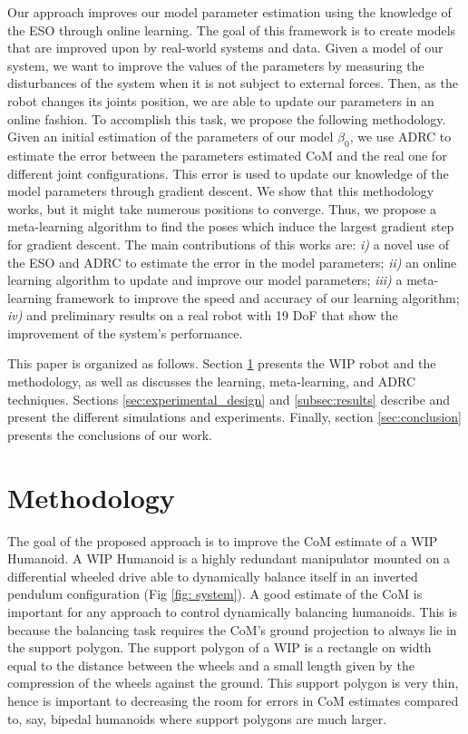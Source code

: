 \documentclass[letterpaper, 10 pt, conference]{ieeeconf}  %
\begin{document}
Our approach improves our model parameter estimation using the knowledge of the \ac{ESO} through online learning.
The goal of this framework is to create models that are improved upon by real-world systems and data. %
Given a model of our system, we want to improve the values of the parameters by measuring the disturbances of the system when it is not subject to external forces. Then, as the robot changes its joints position, we are able to update our parameters in an online fashion.
To accomplish this task, we propose the following methodology. Given an initial estimation of the parameters of our model $\beta_0$, we use \ac{ADRC} \cite{Gao2006} to estimate the error between the parameters estimated \ac{CoM} and the real one for different joint configurations. This error is used to update our knowledge of the model parameters through gradient descent. We show that this methodology works, but it might take numerous positions to converge. Thus, we propose a meta-learning algorithm to find the poses which induce the largest gradient step for gradient descent.
The main contributions of this works are: \textit{i)} a novel use of the \ac{ESO} and \ac{ADRC} to estimate the error in the model parameters; \textit{ii)} an online learning algorithm to update and improve our model parameters; \textit{iii)} a meta-learning framework to improve the speed and accuracy of our learning algorithm; \textit{iv)} and  preliminary results on a real robot with 19 \ac{DoF} that show the improvement of the system's performance.

This paper is organized as follows. Section \ref{sec:method} presents the \ac{WIP} robot and the methodology, as well as discusses the learning, meta-learning, and \ac{ADRC} techniques. Sections \ref{sec:experimental_design} and \ref{subsec:results} describe and present the different simulations and experiments. Finally, section \ref{sec:conclusion} presents the conclusions of our work.

\section{Methodology}
\label{sec:method}

The goal of the proposed approach is to improve the \ac{CoM} estimate of a \ac{WIP} Humanoid. A \ac{WIP} Humanoid is a highly redundant manipulator mounted on a differential wheeled drive able to dynamically balance itself in an inverted pendulum configuration (Fig \ref{fig: system}). A good estimate of the \ac{CoM} is important for any approach to control dynamically balancing humanoids. This is because the balancing task requires the \ac{CoM}'s ground projection to always lie in the support polygon. The support polygon of a WIP is a rectangle on width equal to the distance between the wheels and a small length given by the compression of the wheels against the ground. This support polygon is very thin, hence is important to decreasing the room for errors in \ac{CoM} estimates compared to, say, bipedal humanoids where support polygons are much larger.
\end{document}
